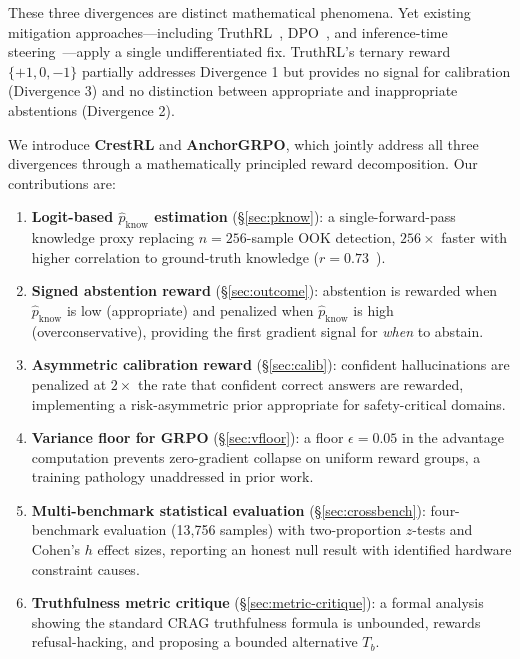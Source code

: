 \documentclass[11pt]{article}
\begin{document}
These three divergences are distinct mathematical phenomena. Yet existing mitigation approaches---including TruthRL~\cite{truthrl2025}, DPO~\cite{rafailov2023dpo}, and inference-time steering~\cite{easysteer2025}---apply a single undifferentiated fix. TruthRL's ternary reward $\{+1, 0, -1\}$ partially addresses Divergence 1 but provides no signal for calibration (Divergence 3) and no distinction between appropriate and inappropriate abstentions (Divergence 2).

We introduce \textbf{CrestRL} and \textbf{AnchorGRPO}, which jointly address all three divergences through a mathematically principled reward decomposition. Our contributions are:

\begin{enumerate}
    \item \textbf{Logit-based $\hat{p}_{\text{know}}$ estimation} (\S\ref{sec:pknow}): a single-forward-pass knowledge proxy replacing $n=256$-sample OOK detection, $256\times$ faster with higher correlation to ground-truth knowledge ($r=0.73$~\cite{kadavath2022language}).

    \item \textbf{Signed abstention reward} (\S\ref{sec:outcome}): abstention is rewarded when $\hat{p}_{\text{know}}$ is low (appropriate) and penalized when $\hat{p}_{\text{know}}$ is high (overconservative), providing the first gradient signal for \emph{when} to abstain.

    \item \textbf{Asymmetric calibration reward} (\S\ref{sec:calib}): confident hallucinations are penalized at $2\times$ the rate that confident correct answers are rewarded, implementing a risk-asymmetric prior appropriate for safety-critical domains.

    \item \textbf{Variance floor for GRPO} (\S\ref{sec:vfloor}): a floor $\epsilon=0.05$ in the advantage computation prevents zero-gradient collapse on uniform reward groups, a training pathology unaddressed in prior work.

    \item \textbf{Multi-benchmark statistical evaluation} (\S\ref{sec:crossbench}): four-benchmark evaluation (13{,}756 samples) with two-proportion $z$-tests and Cohen's $h$ effect sizes, reporting an honest null result with identified hardware constraint causes.

    \item \textbf{Truthfulness metric critique} (\S\ref{sec:metric-critique}): a formal analysis showing the standard CRAG truthfulness formula is unbounded, rewards refusal-hacking, and proposing a bounded alternative $T_b$.
\end{enumerate}
\end{document}

